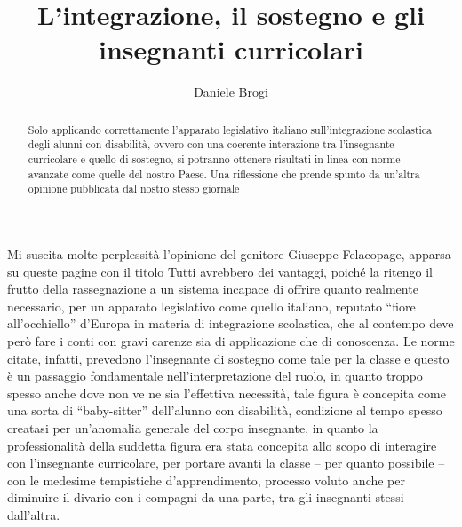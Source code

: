 \author{Daniele Brogi}
\title{L'integrazione, il sostegno e gli insegnanti curricolari}
\label{brogi260413}
\begin{abstract}
Solo applicando correttamente l'apparato legislativo italiano sull'integrazione scolastica degli alunni con disabilità, ovvero con una coerente interazione tra l'insegnante curricolare e quello di sostegno, si potranno ottenere risultati in linea con norme avanzate come quelle del nostro Paese. Una riflessione che prende spunto da un'altra opinione pubblicata dal nostro stesso giornale
\end{abstract}
\maketitle
{}
Mi suscita molte perplessità l'opinione del genitore Giuseppe Felacopage\pageref{cha:felaco260413}, apparsa su queste pagine con il titolo Tutti avrebbero dei vantaggi, poiché la ritengo il frutto della rassegnazione a un sistema incapace di offrire quanto realmente necessario, per un apparato legislativo come quello italiano, reputato “fiore all'occhiello” d'Europa in materia di integrazione scolastica, che al contempo deve però fare i conti con gravi carenze sia di applicazione che di conoscenza.
Le norme citate, infatti, prevedono l'insegnante di sostegno come tale per la classe e questo è un passaggio fondamentale nell'interpretazione del ruolo, in quanto troppo spesso anche dove non ve ne sia l'effettiva necessità, tale figura è concepita come una sorta di “baby-sitter” dell'alunno con disabilità, condizione al tempo spesso creatasi per un'anomalia generale del corpo insegnante, in quanto la professionalità della suddetta figura era stata concepita allo scopo di interagire con l'insegnante curricolare, per portare avanti la classe – per quanto possibile – con le medesime tempistiche d'apprendimento, processo voluto anche per diminuire il divario con i compagni da una parte, tra gli insegnanti stessi dall'altra.

